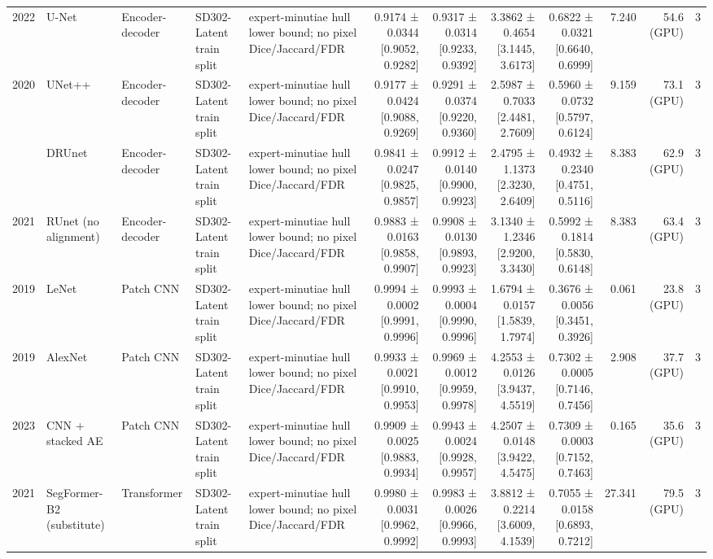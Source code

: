 \begin{table}[t]
\begin{tabular}{rllllrrrrrrr}
2022 & U-Net & Encoder-decoder & SD302-Latent train split & expert-minutiae hull lower bound; no pixel Dice/Jaccard/FDR & 0.9174 ± 0.0344 [0.9052, 0.9282] & 0.9317 ± 0.0314 [0.9233, 0.9392] & 3.3862 ± 0.4654 [3.1445, 3.6173] & 0.6822 ± 0.0321 [0.6640, 0.6999] & 7.240 & 54.6 (GPU) & 3 \\
2020 & UNet++ & Encoder-decoder & SD302-Latent train split & expert-minutiae hull lower bound; no pixel Dice/Jaccard/FDR & 0.9177 ± 0.0424 [0.9088, 0.9269] & 0.9291 ± 0.0374 [0.9220, 0.9360] & 2.5987 ± 0.7033 [2.4481, 2.7609] & 0.5960 ± 0.0732 [0.5797, 0.6124] & 9.159 & 73.1 (GPU) & 3 \\
 & DRUnet & Encoder-decoder & SD302-Latent train split & expert-minutiae hull lower bound; no pixel Dice/Jaccard/FDR & 0.9841 ± 0.0247 [0.9825, 0.9857] & 0.9912 ± 0.0140 [0.9900, 0.9923] & 2.4795 ± 1.1373 [2.3230, 2.6409] & 0.4932 ± 0.2340 [0.4751, 0.5116] & 8.383 & 62.9 (GPU) & 3 \\
2021 & RUnet (no alignment) & Encoder-decoder & SD302-Latent train split & expert-minutiae hull lower bound; no pixel Dice/Jaccard/FDR & 0.9883 ± 0.0163 [0.9858, 0.9907] & 0.9908 ± 0.0130 [0.9893, 0.9923] & 3.1340 ± 1.2346 [2.9200, 3.3430] & 0.5992 ± 0.1814 [0.5830, 0.6148] & 8.383 & 63.4 (GPU) & 3 \\
2019 & LeNet & Patch CNN & SD302-Latent train split & expert-minutiae hull lower bound; no pixel Dice/Jaccard/FDR & 0.9994 ± 0.0002 [0.9991, 0.9996] & 0.9993 ± 0.0004 [0.9990, 0.9996] & 1.6794 ± 0.0157 [1.5839, 1.7974] & 0.3676 ± 0.0056 [0.3451, 0.3926] & 0.061 & 23.8 (GPU) & 3 \\
2019 & AlexNet & Patch CNN & SD302-Latent train split & expert-minutiae hull lower bound; no pixel Dice/Jaccard/FDR & 0.9933 ± 0.0021 [0.9910, 0.9953] & 0.9969 ± 0.0012 [0.9959, 0.9978] & 4.2553 ± 0.0126 [3.9437, 4.5519] & 0.7302 ± 0.0005 [0.7146, 0.7456] & 2.908 & 37.7 (GPU) & 3 \\
2023 & CNN + stacked AE & Patch CNN & SD302-Latent train split & expert-minutiae hull lower bound; no pixel Dice/Jaccard/FDR & 0.9909 ± 0.0025 [0.9883, 0.9934] & 0.9943 ± 0.0024 [0.9928, 0.9957] & 4.2507 ± 0.0148 [3.9422, 4.5475] & 0.7309 ± 0.0003 [0.7152, 0.7463] & 0.165 & 35.6 (GPU) & 3 \\
2021 & SegFormer-B2 (substitute) & Transformer & SD302-Latent train split & expert-minutiae hull lower bound; no pixel Dice/Jaccard/FDR & 0.9980 ± 0.0031 [0.9962, 0.9992] & 0.9983 ± 0.0026 [0.9966, 0.9993] & 3.8812 ± 0.2214 [3.6009, 4.1539] & 0.7055 ± 0.0158 [0.6893, 0.7212] & 27.341 & 79.5 (GPU) & 3 \\

\end{tabular}
\end{table}
